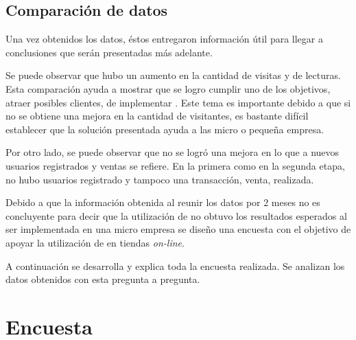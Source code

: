 \subsection{Comparación de datos}

Una vez obtenidos los datos, éstos entregaron información útil para llegar a
conclusiones que serán presentadas más adelante.

Se puede observar que hubo un aumento en la cantidad de visitas y de lecturas.
Esta comparación ayuda a mostrar que se logro cumplir uno de los objetivos,
atraer posibles clientes, de implementar {\GAM}.
Este tema es importante debido a que si no se obtiene una mejora en la cantidad
de visitantes, es bastante difícil establecer que la solución presentada ayuda
a las micro o pequeña empresa.

Por otro lado, se puede observar que no se logró una mejora en lo que a nuevos
usuarios registrados y ventas se refiere.
En la primera como en la segunda etapa, no hubo usuarios registrado y tampoco
una transacción, venta, realizada.

Debido a que la información obtenida al reunir los datos por 2 meses no es
concluyente para decir que la utilización de {\GAM} no obtuvo los resultados
esperados al ser implementada en una micro empresa se diseño una encuesta con el
objetivo de apoyar la utilización de {\GAM} en tiendas \emph{on-line}.

A continuación se desarrolla y explica toda la encuesta realizada.
Se analizan los datos obtenidos con esta pregunta a pregunta.

\section{Encuesta}

